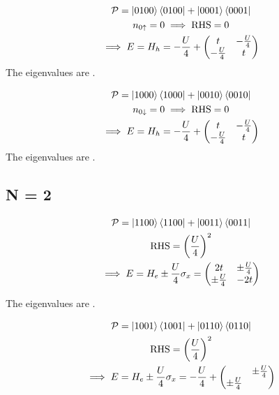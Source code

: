 \documentclass[12pt]{article}
\begin{document}
\begin{gather}
\mathcal{P} = \ket{0100}\bra{0100}+\ket{0001}\bra{0001}\\
n_{0\uparrow} = 0 \implies \text{RHS} = 0 \\
	\implies E = H_h = -\frac{U}{4} + \begin{pmatrix} t & -\frac{U}{4} \\ -\frac{U}{4} & t \end{pmatrix}
\end{gather}
The eigenvalues are .

\begin{gather}
\mathcal{P} = \ket{1000}\bra{1000}+\ket{0010}\bra{0010}\\
n_{0\downarrow} = 0 \implies \text{RHS} = 0 \\
	\implies E = H_h = -\frac{U}{4} + \begin{pmatrix} t & -\frac{U}{4} \\ -\frac{U}{4} & t \end{pmatrix}
\end{gather}
The eigenvalues are .

\subsection{N = 2}

\begin{gather}
	\mathcal{P} = \ket{1100}\bra{1100} + \ket{0011}\bra{0011}\\
	\text{RHS} = \left({\frac{U}{4}}\right)^2 \\
	\implies E = H_e \pm \frac{U}{4}\sigma_x = \begin{pmatrix} 2t & \pm\frac{U}{4} \\ \pm\frac{U}{4} & -2t \end{pmatrix} 
\end{gather}

The eigenvalues are .

\begin{gather}
	\mathcal{P} = \ket{1001}\bra{1001} + \ket{0110}\bra{0110}\\
	\text{RHS} = \left({\frac{U}{4}}\right)^2 \\
	\implies E = H_e \pm \frac{U}{4}\sigma_x = -\frac{U}{4}+{\begin{pmatrix} & \pm\frac{U}{4} \\ \pm\frac{U}{4} & \end{pmatrix}}
\end{gather}
\end{document}
